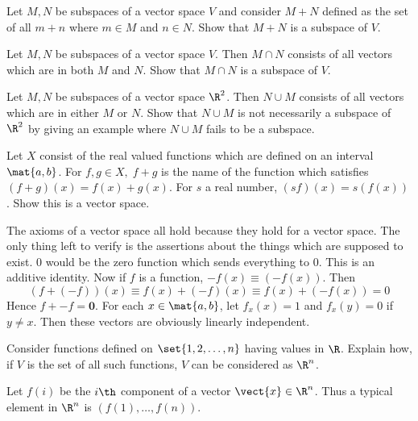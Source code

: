 \begin{ex} Let $M,N$ be subspaces of a vector space $V$ and consider $M+N$
defined as the set of all $m+n$ where $m\in M$ and $n\in N$. Show that $M+N$
is a subspace of $V$.
\end{ex}

\begin{ex} Let $M,N$ be subspaces of a vector space $V$. Then $M\cap N$ consists
of all vectors which are in both $M$ and $N$. Show that $M\cap N$ is a
subspace of $V$.
\end{ex}

\begin{ex} Let $M,N$ be subspaces of a vector space $\R^{2}$. Then $N\cup
M$ consists of all vectors which are in either $M$ or $N$. Show that $N\cup
M $ is not necessarily a subspace of $\R^{2}$ by giving an example
where $N\cup M$ fails to be a subspace.
\end{ex}

\begin{ex} \label{4-july-prob1}Let $X$ consist of the real valued functions which
are defined on an interval $\mat{a,b}$. For $f,g\in X,\;f+g$ is the
name of the function which satisfies $(f+g) (x)
=f(x) +g(x)$. For $s$ a real number, $
(s f) (x) = s (f(x)
)$. Show this is a vector space.
\begin{sol}
The axioms of a vector space all hold because they
hold for a vector space. The only thing left to verify is the
assertions about the things which are supposed to exist. $0$ would
be the zero function which sends everything to $0$. This is an additive
identity. Now if $f$ is a function, $-f(x) \equiv (
-f(x))$. Then
\[
(f+(-f)) (x) \equiv f(x)
+(-f) (x) \equiv f(x) +(-f(
x)) =0
\]
Hence $f+-f=\mathbf{0}$. For each $x\in \mat{a,b}$, let $%
f_{x}(x) =1$ and $f_{x}(y) =0$ if $y\neq x$. Then
these vectors are obviously linearly independent.
\end{sol}
\end{ex}

\begin{ex} Consider functions defined on $\set{1,2,\ldots,n} $ having
values in $\R$. Explain how, if $V$ is the set of all such
functions, $V$ can be considered as $\R^{n}$.
\begin{sol}
Let $f(i) $ be the $i\th$ component of a vector $
\vect{x}\in \R^{n}$. Thus a typical element in $\R^{n}$ is $
(f(1) ,\ldots,f(n))$.
\end{sol}
\end{ex}


